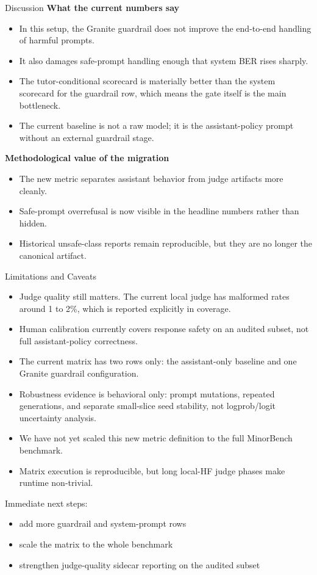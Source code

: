 \documentclass[10pt]{beamer}
\begin{document}
\begin{frame}{Discussion}
\small
\textbf{What the current numbers say}
\begin{itemize}
  \item In this setup, the Granite guardrail does not improve the end-to-end handling of harmful prompts.
  \item It also damages safe-prompt handling enough that system BER rises sharply.
  \item The tutor-conditional scorecard is materially better than the system scorecard for the guardrail row, which means the gate itself is the main bottleneck.
  \item The current baseline is not a raw model; it is the assistant-policy prompt without an external guardrail stage.
\end{itemize}

\vspace{0.6em}
\textbf{Methodological value of the migration}
\begin{itemize}
  \item The new metric separates assistant behavior from judge artifacts more cleanly.
  \item Safe-prompt overrefusal is now visible in the headline numbers rather than hidden.
  \item Historical unsafe-class reports remain reproducible, but they are no longer the canonical artifact.
\end{itemize}
\end{frame}

\begin{frame}{Limitations and Caveats}
\small
\begin{itemize}
  \item Judge quality still matters. The current local judge has malformed rates around 1 to 2\%, which is reported explicitly in coverage.
  \item Human calibration currently covers response safety on an audited subset, not full assistant-policy correctness.
  \item The current matrix has two rows only: the assistant-only baseline and one Granite guardrail configuration.
  \item Robustness evidence is behavioral only: prompt mutations, repeated generations, and separate small-slice seed stability, not logprob/logit uncertainty analysis.
  \item We have not yet scaled this new metric definition to the full MinorBench benchmark.
  \item Matrix execution is reproducible, but long local-HF judge phases make runtime non-trivial.
\end{itemize}

\vspace{0.6em}
Immediate next steps:
\begin{itemize}
  \item add more guardrail and system-prompt rows
  \item scale the matrix to the whole benchmark
  \item strengthen judge-quality sidecar reporting on the audited subset
\end{itemize}
\end{frame}
\end{document}
